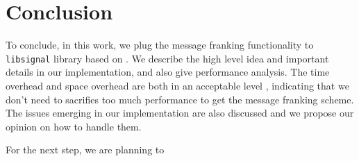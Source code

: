 
\section{Conclusion}
To conclude,
in this work, we plug the message franking functionality to \texttt{libsignal} library
based on .
We describe the high level idea and important details in our implementation,
and also give performance analysis. 
The time overhead and space overhead are both in an acceptable level ,
indicating that we don't need to sacrifies too much performance to get the message franking scheme.
The issues emerging in our implementation are also discussed and
we propose our opinion on how to handle them.

For the next step,
we are planning to 